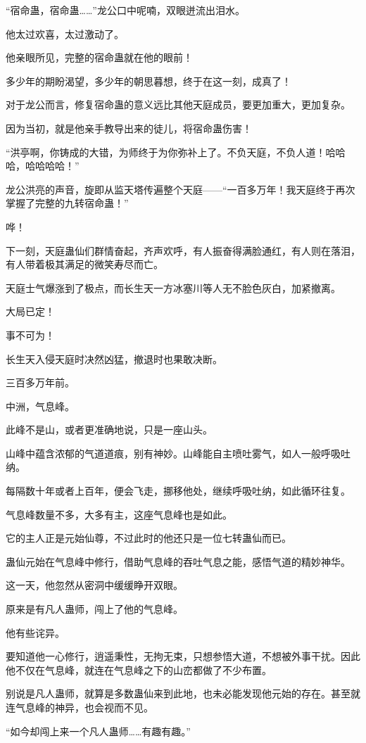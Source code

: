 \begin{this_body}
“宿命蛊，宿命蛊……”龙公口中呢喃，双眼迸流出泪水。

他太过欢喜，太过激动了。

他亲眼所见，完整的宿命蛊就在他的眼前！

多少年的期盼渴望，多少年的朝思暮想，终于在这一刻，成真了！

对于龙公而言，修复宿命蛊的意义远比其他天庭成员，要更加重大，更加复杂。

因为当初，就是他亲手教导出来的徒儿，将宿命蛊伤害！

“洪亭啊，你铸成的大错，为师终于为你弥补上了。不负天庭，不负人道！哈哈哈，哈哈哈哈！”

龙公洪亮的声音，旋即从监天塔传遍整个天庭——“一百多万年！我天庭终于再次掌握了完整的九转宿命蛊！”

哗！

下一刻，天庭蛊仙们群情奋起，齐声欢呼，有人振奋得满脸通红，有人则在落泪，有人带着极其满足的微笑寿尽而亡。

天庭士气爆涨到了极点，而长生天一方冰塞川等人无不脸色灰白，加紧撤离。

大局已定！

事不可为！

长生天入侵天庭时决然凶猛，撤退时也果敢决断。

三百多万年前。

中洲，气息峰。

此峰不是山，或者更准确地说，只是一座山头。

山峰中蕴含浓郁的气道道痕，别有神妙。山峰能自主喷吐雾气，如人一般呼吸吐纳。

每隔数十年或者上百年，便会飞走，挪移他处，继续呼吸吐纳，如此循环往复。

气息峰数量不多，大多有主，这座气息峰也是如此。

它的主人正是元始仙尊，不过此时的他还只是一位七转蛊仙而已。

蛊仙元始在气息峰中修行，借助气息峰的吞吐气息之能，感悟气道的精妙神华。

这一天，他忽然从密洞中缓缓睁开双眼。

原来是有凡人蛊师，闯上了他的气息峰。

他有些诧异。

要知道他一心修行，逍遥秉性，无拘无束，只想参悟大道，不想被外事干扰。因此他不仅在气息峰，就连在气息峰之下的山峦都做了不少布置。

别说是凡人蛊师，就算是多数蛊仙来到此地，也未必能发现他元始的存在。甚至就连气息峰的神异，也会视而不见。

“如今却闯上来一个凡人蛊师……有趣有趣。”


\end{this_body}
